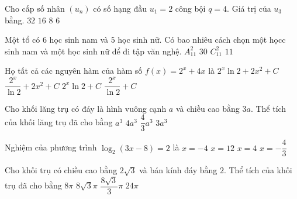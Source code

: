 \begin{ex}%
Cho cấp số nhân $\left(u_n\right)$ có số hạng đầu $u_1=2$ công bội $q=4$. Giá trị của $u_3$ bằng.
\choice
{\True $32$}
{$16$}
{$8$}
{$6$}

\end{ex}
\begin{ex}%
Một tổ có $6$ học sinh nam và $5$ học sinh nữ. Có bao nhiêu cách chọn một họcc sinh nam và một học sinh nữ để đi tập văn nghệ.
\choice
{$A_{11}^2$}
{\True $30$}
{$C_{11}^2$}
{$11$}

\end{ex}
\begin{ex}%
Họ tất cả các nguyên hàm của hàm số $f(x)=2^{x}+4 x$ là
\choice
{$2^{x} \ln 2+2 x^2+C$}
{\True $\dfrac{2^{x}}{\ln 2}+2 x^2+C$}
{$2^{x} \ln 2+C$}
{$\dfrac{2^{x}}{\ln 2}+C$}

\end{ex}
\begin{ex}%
Cho khối lăng trụ có đáy là hình vuông cạnh $a$ và chiều cao bằng $3 a$. Thể tích của khối lăng trụ đã cho bằng
\choice
{$a^3$}
{$4 a^3$}
{$\dfrac{4}{3} a^3$}
{\True $3 a^3$}

\end{ex}
\begin{ex}%
Nghiệm của phương trình $\log_2(3 x-8)=2$ là
\choice
{$x=-4$}
{$x=12$}
{\True $x=4$}
{$x=-\dfrac{4}{3}$}

\end{ex}
\begin{ex}%
Cho khối trụ có chiều cao bằng $2\sqrt{3}$ và bán kính đáy bằng $2$. Thể tích của khối trụ đã cho bằng
\choice
{$8\pi$}
{\True $8\sqrt{3} \pi$}
{$\dfrac{8\sqrt{3}}{3} \pi$}
{$24\pi$}

\end{ex}
\begin{ex}%
{\vspace{-0.5cm}

}

\end{ex}
